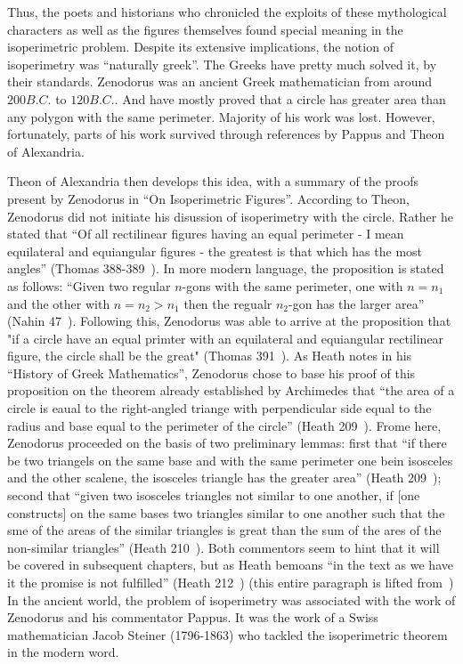 \documentclass[a4paper]{book}
\begin{document}
\leavevmode
\newline
\newline
Thus, the poets and historians who chronicled the exploits of these mythological characters as well as the figures themselves found special meaning in the isoperimetric problem. Despite its extensive implications, the notion of isoperimetry was ``naturally greek''. The Greeks have pretty much solved it, by their standards. Zenodorus was an ancient Greek mathematician from around $200B.C.$ to $120B.C.$. And have mostly proved that a circle has greater area than any polygon with the same perimeter. Majority of his work was lost. However, fortunately, parts of his work survived through references by Pappus and Theon of Alexandria.

Theon of Alexandria then develops this idea, with a summary of the proofs present by Zenodorus in ``On Isoperimetric Figures''. According to Theon, Zenodorus did not initiate his disussion of isoperimetry with the circle. Rather he stated that ``Of all rectilinear figures having an equal perimeter - I mean equilateral and equiangular figures - the greatest is that which has the most angles'' (Thomas 388-389~\cite{ivor1941selections}). In more modern language, the proposition is stated as follows: ``Given two regular $n$-gons with the same perimeter, one with $n=n_1$ and the other with $n=n_2>n_1$ then the regualr $n_2$-gon has the larger area'' (Nahin 47~\cite{nahin2021least}). Following this, Zenodorus was able to arrive at the proposition that "if a circle have an equal primter with an equilateral and equiangular rectilinear figure, the circle shall be the great" (Thomas 391~\cite{ivor1941selections}). As Heath notes in his ``History of Greek Mathematics'', Zenodorus chose to base his proof of this proposition on the theorem already established by Archimedes that ``the area of a circle is eaual to the right-angled triange with perpendicular side equal to the radius and base equal to the perimeter of the circle'' (Heath 209~\cite{heath2013history}). Frome here, Zenodorus proceeded on the basis of two preliminary lemmas: first that ``if there be two triangels on the same base and with the same perimeter one bein isosceles and the other scalene, the isosceles triangle has the greater area'' (Heath 209~\cite{heath2013history}); second that ``given two isosceles triangles not similar to one another, if [one constructs] on the same bases two triangles similar to one another such that the sme of the areas of the similar triangles is great than the sum of the ares of the non-similar triangles'' (Heath 210~\cite{heath2013history}). Both commentors seem to hint that it will be covered in subsequent chapters, but as Heath bemoans ``in the text as we have it the promise is not fulfilled'' (Heath 212~\cite{heath2013history}) (this entire paragraph is lifted from~\cite{wiegert2010sagacity})
\newline
\newline
In the ancient world, the problem of isoperimetry was associated with the work of Zenodorus and his commentator Pappus. It was the work of a  Swiss mathematician Jacob Steiner (1796-1863) who tackled the isoperimetric theorem in the modern word.
\end{document}
